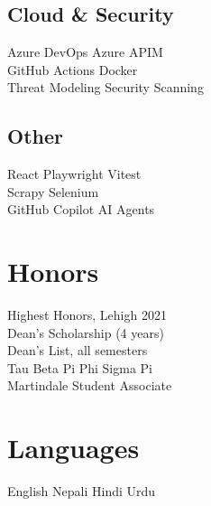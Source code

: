 \documentclass[]{deedy-resume-openfont}
\begin{document}
\begin{minipage}[t]{0.30\textwidth}
\subsection{Cloud \& Security}
Azure DevOps \textbullet{} Azure APIM \\
GitHub Actions \textbullet{} Docker \\
Threat Modeling \textbullet{} Security Scanning \\
\sectionsep
\subsection{Other}
React \textbullet{} Playwright \textbullet{} Vitest \\
Scrapy \textbullet{} Selenium \\
GitHub Copilot \textbullet{} AI Agents \\
\sectionsep

\section{Honors}
Highest Honors, Lehigh 2021 \\
Dean's Scholarship (4 years) \\
Dean's List, all semesters \\
Tau Beta Pi \textbullet{} Phi Sigma Pi \\
Martindale Student Associate \\
\sectionsep

\section{Languages}
English \textbullet{} Nepali \textbullet{} Hindi \textbullet{} Urdu

\end{minipage}
\hfill
\end{document}
